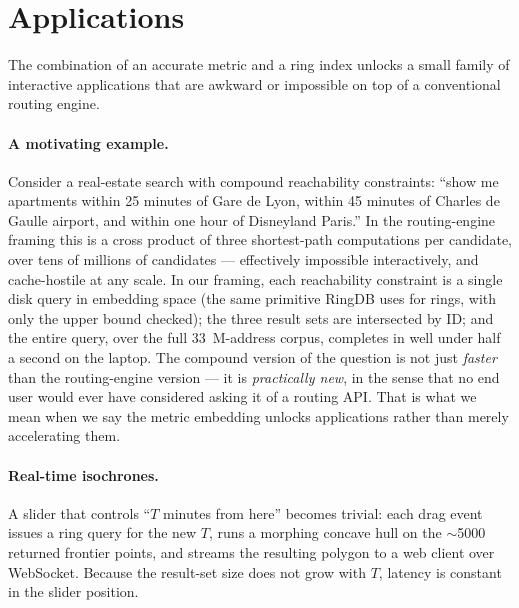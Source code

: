 \documentclass[11pt,a4paper]{article}
\begin{document}
\section{Applications}

The combination of an accurate metric and a ring index unlocks a
small family of interactive applications that are awkward or
impossible on top of a conventional routing engine.

\paragraph{A motivating example.}
Consider a real-estate search with compound reachability constraints:
``show me apartments within 25 minutes of Gare de Lyon, within
45 minutes of Charles de Gaulle airport, and within one hour of
Disneyland Paris.'' In the routing-engine framing this is a cross
product of three shortest-path computations per candidate, over tens
of millions of candidates --- effectively impossible interactively,
and cache-hostile at any scale. In our framing, each reachability
constraint is a single disk query in embedding space (the same
primitive RingDB uses for rings, with only the upper bound checked);
the three result sets are intersected by ID; and the entire query,
over the full 33~M-address corpus, completes in well under half a
second on the laptop. The compound version of the question is not
just \emph{faster} than the routing-engine version --- it is
\emph{practically new}, in the sense that no end user would ever
have considered asking it of a routing API. That is what we mean
when we say the metric embedding unlocks applications rather than
merely accelerating them.

\paragraph{Real-time isochrones.}
A slider that controls ``$T$ minutes from here'' becomes trivial:
each drag event issues a ring query for the new $T$, runs a morphing
concave hull on the $\sim$5000 returned frontier points, and streams
the resulting polygon to a web client over WebSocket. Because the
result-set size does not grow with $T$, latency is constant in the
slider position.
\end{document}

